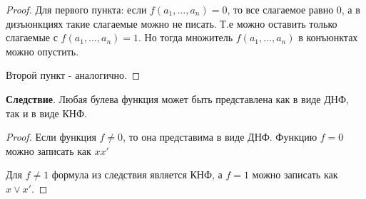 \documentclass[a4paper]{article}
\theoremstyle{definition}
\theoremstyle{remark}
\begin{document}
    \begin{proof}
        Для первого пункта: если $f(a_1, \dots, a_n) = 0$, то все слагаемое равно 0, а в дизъюнкциях
        такие слагаемые можно не писать. Т.е можно оставить только слагаемые с $f(a_1, \dots, a_n) = 1$.
        Но тогда множитель $f(a_1, \dots, a_n)$ в конъюнктах можно опустить.

        Второй пункт - аналогично.
    \end{proof}

    \textbf{Следствие}. Любая булева функция может быть представлена как в виде ДНФ, так и в виде КНФ.
    \begin{proof}
        Если функция $f\neq 0$, то она представима в виде ДНФ. Функцию $f = 0$ можно записать как $xx'$

        Для $f\neq 1$ формула из следствия является КНФ, а $f = 1$ можно записать как $x\vee x'$.
    \end{proof}
\end{document}
